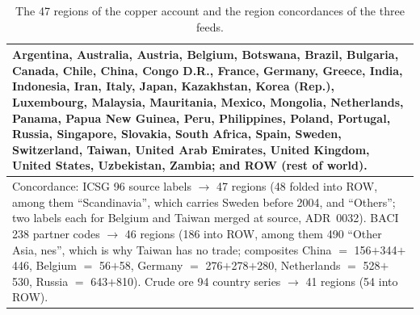 \documentclass[11pt]{article}
\begin{document}
\begin{table}[h]
\centering\small
\begin{tabular}{@{}p{14.5cm}@{}}
\toprule
Argentina, Australia, Austria, Belgium, Botswana, Brazil, Bulgaria, Canada,
Chile, China, Congo D.R., France, Germany, Greece, India, Indonesia, Iran,
Italy, Japan, Kazakhstan, Korea (Rep.), Luxembourg, Malaysia, Mauritania,
Mexico, Mongolia, Netherlands, Panama, Papua New Guinea, Peru, Philippines,
Poland, Portugal, Russia, Singapore, Slovakia, South Africa, Spain, Sweden,
Switzerland, Taiwan, United Arab Emirates, United Kingdom, United States,
Uzbekistan, Zambia; and ROW (rest of world). \\
\midrule
Concordance: ICSG 96 source labels $\to$ 47 regions (48 folded into ROW,
among them ``Scandinavia'', which carries Sweden before 2004, and
``Others''; two labels each for Belgium and Taiwan merged at source,
ADR~0032). BACI 238 partner codes $\to$ 46 regions (186 into ROW, among them
490 ``Other Asia, nes'', which is why Taiwan has no trade; composites China
$=$ 156$+$344$+$446, Belgium $=$ 56$+$58, Germany $=$ 276$+$278$+$280,
Netherlands $=$ 528$+$530, Russia $=$ 643$+$810). Crude ore 94 country
series $\to$ 41 regions (54 into ROW). \\
\bottomrule
\end{tabular}
\caption{The 47 regions of the copper account and the region concordances
of the three feeds.}
\label{tab:si-regions}
\end{table}
\end{document}
